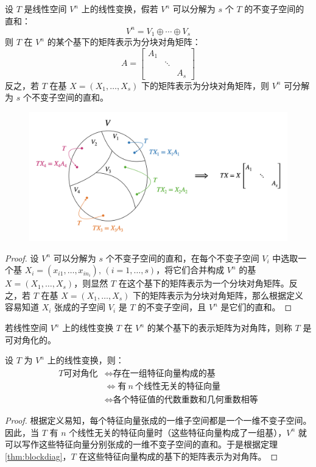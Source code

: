 \begin{theorem}[分块对角化]
\label{thm:blockdiag}
设 $T$ 是线性空间 $V^n$ 上的线性变换，假若 $V^n$ 可以分解为 $s$ 个 $T$ 的不变子空间的直和：
\[
    V^n=V_1\oplus\cdots\oplus V_s
\]
则 $T$ 在 $V^n$ 的某个基下的矩阵表示为分块对角矩阵：
\[
    A=\begin{bmatrix}A_1&&\\&\ddots&\\&&A_s\end{bmatrix}
\]
反之，若 $T$ 在基 $X=(X_1,\ldots,X_s)$ 下的矩阵表示为分块对角矩阵，则 $V^n$ 可分解为 $s$ 个不变子空间的直和。
\begin{figure}[H]
    \centering
    \includegraphics[width=0.8\linewidth]{figs/subspaces.png}
\end{figure}
\end{theorem}
\begin{proof}
设 $V^n$ 可以分解为 $s$ 个不变子空间的直和，在每个不变子空间 $V_i$ 中选取一个基 $X_i=(x_{i1},\ldots,x_{in_i}),\,(i=1,\ldots,s)$，将它们合并构成 $V^n$ 的基 $X=(X_1,\ldots,X_s)$，则显然 $T$ 在这个基下的矩阵表示为一个分块对角矩阵。反之，若 $T$ 在基 $X=(X_1,\ldots,X_s)$ 下的矩阵表示为分块对角矩阵，那么根据定义容易知道 $X_i$ 张成的子空间 $V_i$ 是 $T$ 的不变子空间，且 $V^n$ 是它们的直和。
\end{proof}

\begin{definition}[可对角化]
若线性空间 $V^n$ 上的线性变换 $T$ 在 $V^n$ 的某个基下的表示矩阵为对角阵，则称 $T$ 是可对角化的。
\end{definition}

\begin{theorem}[可对角化的充要条件]
设 $T$ 为 $V^n$ 上的线性变换，则：
\begin{align*}
    T \text{可对角化}&\iff \text{存在一组特征向量构成的基}\\
    &\iff \text{有}\ n\ \text{个线性无关的特征向量}\\
    &\iff \text{各个特征值的代数重数和几何重数相等}
\end{align*}
\end{theorem}
\begin{proof}
根据定义易知，每个特征向量张成的一维子空间都是一个一维不变子空间。因此，当 $T$ 有 $n$ 个线性无关的特征向量时（这些特征向量构成了一组基），$V^n$ 就可以写作这些特征向量分别张成的一维不变子空间的直和。于是根据定理 \ref{thm:blockdiag}，$T$ 在这些特征向量构成的基下的矩阵表示为对角阵。
\end{proof}

